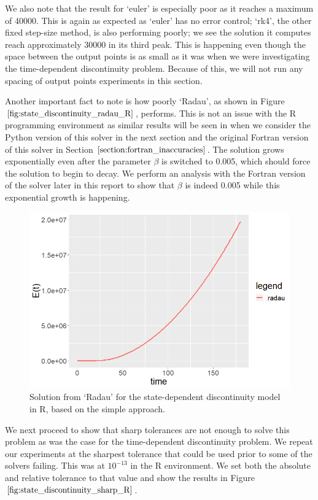 We also note that the result for `euler' is especially poor as it reaches a maximum of 40000. This is again as expected as `euler' has no error control; `rk4', the other fixed step-size method, is also performing poorly; we see the solution it computes reach approximately 30000 in its third peak. This is happening even though the space between the output points is as small as it was when we were investigating the time-dependent discontinuity problem. Because of this, we will not run any spacing of output points experiments in this section. %

Another important fact to note is how poorly `Radau', as shown in Figure $\ref{fig:state_discontinuity_radau_R}$, performs. This is not an issue with the R programming environment as similar results will be seen in when we consider the Python version of this solver in the next section and the original Fortran version of this solver  in 
Section $\ref{section:fortran_inaccuracies}$. The solution grows exponentially even after the parameter $\beta$ is switched to 0.005, which should force the solution to begin to decay. We perform an analysis with the Fortran version of the solver later in this report to show that $\beta$ is indeed 0.005 while this exponential growth is happening. 

\begin{figure}[h]
\centering
\includegraphics[width=0.7\linewidth]{./figures/state_discontinuity_radau_R}
\caption{Solution from `Radau' for the state-dependent discontinuity model in R, based on the simple approach.}
\label{fig:state_discontinuity_radau_R}
\end{figure}

We next proceed to show that sharp tolerances are not enough to solve this problem as was the case for the time-dependent discontinuity problem. We repeat our experiments at the sharpest tolerance that could be used prior to some of the solvers failing. This was at $10^{-13}$ in the R environment. We set both the absolute and relative tolerance to that value and show the results in Figure $\ref{fig:state_discontinuity_sharp_R}$.

